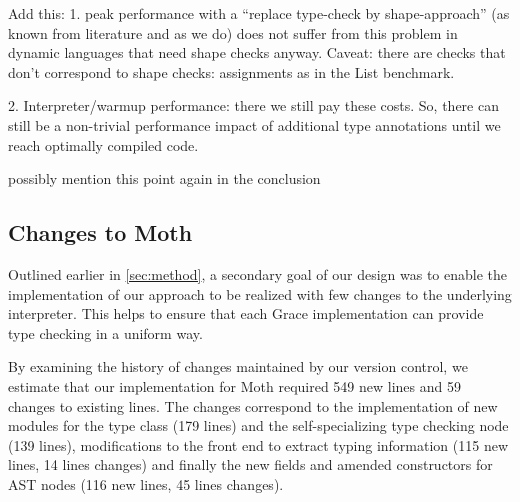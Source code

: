 
\begin{note}
Add this:
1. peak performance with a “replace type-check by shape-approach” (as known from literature and as we do) does not suffer from this problem in dynamic languages that need shape checks anyway.
Caveat: there are checks that don’t correspond to shape checks: assignments as in the List benchmark.

2. Interpreter/warmup performance: there we still pay these costs. So, there can still be a non-trivial performance impact of additional type annotations until we reach optimally compiled code.

possibly mention this point again in the conclusion
\end{note}



\subsection{Changes to Moth}

Outlined earlier in \cref{sec:method}, a secondary
goal of our design was to enable the implementation of our approach to be
realized with few changes to the underlying interpreter.
This helps to ensure that each Grace implementation
can provide type checking in a uniform way.

By examining the history of changes maintained by our version control, 
we estimate that our implementation for Moth required
549 new lines and 59 changes to existing lines. 
The changes correspond to the implementation of 
new modules for the type class (179 lines) and 
the self-specializing type checking node (139 lines),
modifications to the front end to extract typing information
(115 new lines, 14 lines changes)
and finally the new fields and amended constructors for AST nodes 
(116 new lines, 45 lines changes).




